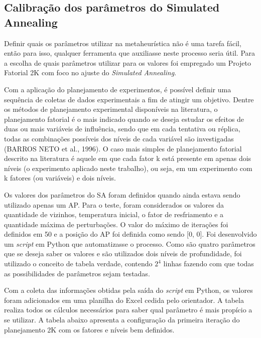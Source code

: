 \documentclass[
	12pt,				%
	openright,			%
	twoside,			%
	a4paper,			%
	english,			%
	french,				%
	spanish,			%
	brazil				%
	]{abntex2}
\begin{document}
\subsection[Calibração dos parâmetros do Simulated Annealing]{Calibração dos parâmetros do Simulated Annealing}

Definir quais os parâmetros utilizar na metaheurística não é uma tarefa fácil, então para isso, qualquer ferramenta que auxiliasse neste processo seria útil. Para a escolha de quais parâmetros utilizar para os valores foi empregado um Projeto Fatorial 2K com foco no ajuste do \textit{Simulated Annealing}. 

Com a aplicação do planejamento de experimentos, é possível definir uma sequência de coletas de dados experimentais a fim de atingir um objetivo. Dentre os métodos de planejamento experimental disponíveis na literatura, o planejamento fatorial  é o mais indicado quando se deseja estudar os efeitos de duas ou mais variáveis de influência, sendo que em cada tentativa ou réplica, todas as combinações possíveis dos níveis de cada variável são investigadas (BARROS NETO et al., 1996). O caso mais simples de planejamento fatorial descrito na literatura é aquele em que cada fator k está presente em apenas dois níveis (o experimento aplicado neste trabalho), ou seja, em um experimento com k fatores (ou variáveis) e dois níveis.

Os valores dos parâmetros do SA foram definidos quando ainda estava sendo utilizado apenas um AP. Para o teste, foram considerados os valores da quantidade de vizinhos, temperatura inicial, o fator de resfriamento e a quantidade máxima de perturbações. O valor do máximo de iterações foi definidos em 50 e a posição do AP foi definida como sendo [0, 0]. Foi desenvolvido um \textit{script} em Python que automatizasse o processo. Como são quatro parâmetros que se deseja saber os valores e são utilizados dois níveis de profundidade, foi utilizado o conceito de tabela verdade, contendo $ 2^{4} $ linhas fazendo com que todas as possibilidades de parâmetros sejam testadas.

Com a coleta das informações obtidas pela saída do \textit{script} em Python, os valores foram adicionados em uma planilha do Excel cedida pelo orientador. A tabela realiza todos os cálculos necessários para saber qual parâmetro é mais propício a se utilizar. A tabela abaixo apresenta a configuração da primeira iteração do planejamento 2K com os fatores e níveis bem definidos.
	
\end{document}
